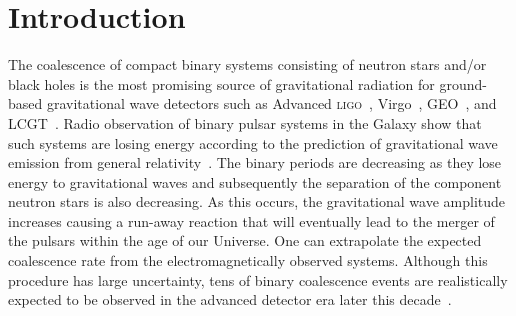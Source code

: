 \section{Introduction}
\label{sec:introduction}



The coalescence of compact binary systems consisting of neutron stars and/or
black holes is the most promising source of gravitational radiation for
ground-based gravitational wave detectors such as Advanced
\textsc{ligo}~\cite{ALIGOWeb}, Virgo~\cite{AVirgoWeb}, GEO~\cite{GEOWeb}, and
LCGT~\cite{LCGTWeb}. Radio observation of binary pulsar systems in the Galaxy
show that such systems are losing energy according to the prediction of
gravitational wave emission from general
relativity~\cite{Taylor:1982}\citeneeded.  The binary periods are decreasing as
they lose energy to gravitational waves and subsequently the separation of the
component neutron stars is also decreasing. As this occurs, the gravitational
wave amplitude increases causing a run-away reaction that will eventually lead
to the merger of the pulsars within the age of our Universe.  One can
extrapolate the expected coalescence rate from the electromagnetically observed
systems.  Although this procedure has large uncertainty, tens of binary
coalescence events are realistically expected to be observed in the advanced
detector era later this decade~\cite{Abadie:2010p10836}.

